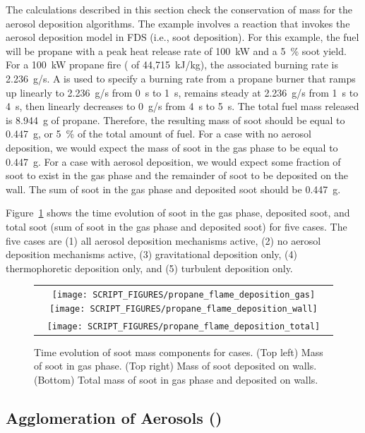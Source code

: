 \documentclass[11pt]{book}
\begin{document}
The calculations described in this section check the conservation of mass for the aerosol deposition algorithms. The example involves a reaction that invokes the aerosol deposition model in FDS (i.e., soot deposition). For this example, the fuel will be propane with a peak heat release rate of 100~kW and a 5~\% soot yield. For a 100~kW propane fire ( of 44,715~kJ/kg), the associated burning rate is 2.236~g/s. A  is used to specify a burning rate from a propane burner that ramps up linearly to 2.236~g/s from 0~s to 1~s, remains steady at 2.236~g/s from 1~s to 4~s, then linearly decreases to 0~g/s from 4~s to 5~s. The total fuel mass released is 8.944~g of propane. Therefore, the resulting mass of soot should be equal to 0.447~g, or 5~\% of the total amount of fuel. For a case with no aerosol deposition, we would expect the mass of soot in the gas phase to be equal to 0.447~g. For a case with aerosol deposition, we would expect some fraction of soot to exist in the gas phase and the remainder of soot to be deposited on the wall. The sum of soot in the gas phase and deposited soot should be 0.447~g.

Figure~\ref{fig:deposition_mass} shows the time evolution of soot in the gas phase, deposited soot, and total soot (sum of soot in the gas phase and deposited soot) for five cases. The five cases are (1) all aerosol deposition mechanisms active, (2) no aerosol deposition mechanisms active, (3) gravitational deposition only, (4) thermophoretic deposition only, and (5) turbulent deposition only.

\begin{figure}[ht]
	\centering
	\begin{tabular}{c}
		\texttt{[image: SCRIPT\_FIGURES/propane\_flame\_deposition\_gas]}
		\texttt{[image: SCRIPT\_FIGURES/propane\_flame\_deposition\_wall]} \\
		\texttt{[image: SCRIPT\_FIGURES/propane\_flame\_deposition\_total]}
	\end{tabular}
	\caption[Soot mass conservation for  case]{Time evolution of soot mass components for  cases. (Top left) Mass of soot in gas phase. (Top right) Mass of soot deposited on walls. (Bottom) Total mass of soot in gas phase and deposited on walls.}
	\label{fig:deposition_mass}
\end{figure}

\subsection{Agglomeration of Aerosols (\texorpdfstring{}{aerosol\_agglomeration})}
	\label{aerosol_agglomeration}
\end{document}
